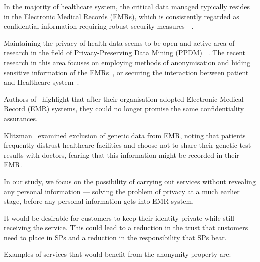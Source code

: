 \documentclass[pdftex,twocolumn,epjc3]{svjour3}
\begin{document}
In the majority of healthcare system, the critical data managed typically resides in the Electronic Medical Records (EMRs), which is consistently regarded as confidential information requiring robust security measures~\cite{jinReviewSecurePrivacypreserving2019}~\cite{keshtaSecurityPrivacyElectronic2021}. 

Maintaining the privacy of health data seems to be open and active area of research in the field of Privacy-Preserving Data Mining (PPDM) ~\cite{nareshPrivacyPreservingData2023,linPPSFOpensourcePrivacypreserving2018,hewagePrivacypreservingDataStream2023}. The recent research in this area focuses on employing methods of anonymisation and hiding sensitive information of the EMRs~\cite{hamdiEnhancingSecurityPrivacy2023, sharmaPrivacyPreservingData2019, wuHidingSensitiveInformation2021}, or securing the interaction between patient and Healthcare system~\cite{zhangPrivacyProtectionTelecare2016, mehmoodAnonymousAuthenticationScheme2018, khasimImprovedFastSecure2022}.

\begin{sloppypar}
Authors of~\cite{blackPresymptomaticTestingConfidentiality2021} highlight that after their organisation adopted Electronic Medical Record (EMR) systems, they could no longer promise the same confidentiality assurances.
\end{sloppypar}

Klitzman~\cite{klitzmanExclusionGeneticInformation2010} examined exclusion of genetic data from EMR, noting that patients frequently distrust healthcare facilities and choose not to share their genetic test results with doctors, fearing that this information might be recorded in their EMR.
 
In our study, we focus on the possibility of carrying out services without revealing any personal information — solving the problem of privacy at a much earlier stage, before any personal information gets into EMR system.

It would be desirable for customers to keep their identity private while still receiving the service. This could lead to a reduction in the trust that customers need to place in SPs and a reduction in the responsibility that SPs bear.

\begin{sloppypar}
Examples of services that would benefit from the anonymity property are:
\end{sloppypar}
\end{document}
